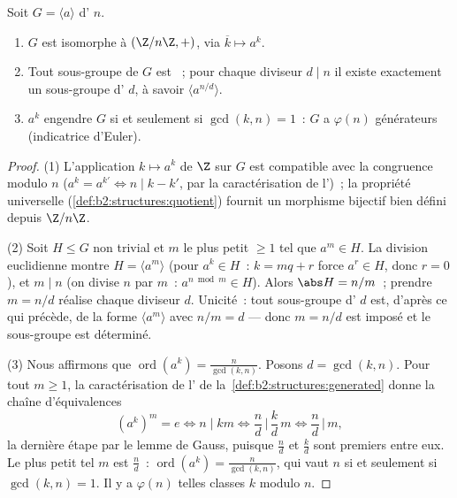 \begin{proposition}\label{prop:b2:structures:cyclic}
Soit $G = \langle a \rangle$  d' $n$.
\begin{enumerate}
  \item $G$ est isomorphe à $(\Z/n\Z, +)$, via $\overline k \mapsto
        a^k$.
  \item Tout sous-groupe de $G$ est ~; pour chaque diviseur $d
        \mid n$ il existe exactement un sous-groupe d' $d$, à
        savoir $\langle a^{n/d}\rangle$.
  \item $a^k$ engendre $G$ si et seulement si $\gcd(k, n) = 1$~: $G$ a
        $\varphi(n)$ générateurs (indicatrice d'Euler).
\end{enumerate}
\end{proposition}

\begin{proof}
(1) L'application $k \mapsto a^k$ de $\Z$ sur $G$ est compatible avec
la congruence modulo $n$ ($a^{k} = a^{k'} \iff n \mid k - k'$, par la
caractérisation de l')~; la propriété universelle
(\cref{def:b2:structures:quotient}) fournit un morphisme bijectif bien
défini depuis $\Z/n\Z$.

(2) Soit $H \leq G$ non trivial et $m$ le plus petit $\geq 1$ tel que
$a^m \in H$. La division euclidienne montre $H = \langle a^m\rangle$
(pour $a^k \in H$~: $k = mq + r$ force $a^r \in H$, donc $r = 0$), et
$m \mid n$ (on divise $n$ par $m$~: $a^{n \bmod m} \in H$). Alors
$\abs H = n/m$~; prendre $m = n/d$ réalise chaque diviseur $d$.
Unicité~: tout sous-groupe d' $d$ est, d'après ce qui précède,
de la forme $\langle a^m \rangle$ avec $n/m = d$ --- donc $m = n/d$
est imposé et le sous-groupe est déterminé.

(3) Nous affirmons que $\operatorname{ord}(a^k) = \frac{n}{\gcd(k,
n)}$. Posons $d = \gcd(k, n)$. Pour tout $m \geq 1$, la
caractérisation de l' de la~\cref{def:b2:structures:generated}
donne la chaîne d'équivalences
\[
(a^k)^m = e
\iff n \mid km
\iff \frac{n}{d} \,\Big|\, \frac{k}{d}\,m
\iff \frac{n}{d} \,\Big|\, m ,
\]
la dernière étape par le lemme de Gauss, puisque $\frac nd$ et
$\frac kd$ sont premiers entre eux. Le plus petit tel $m$ est
$\frac nd$~: $\operatorname{ord}(a^k) = \frac n{\gcd(k,n)}$, qui
vaut $n$ si et seulement si $\gcd(k, n) = 1$. Il y a $\varphi(n)$
telles classes $k$ modulo $n$.
\end{proof}

